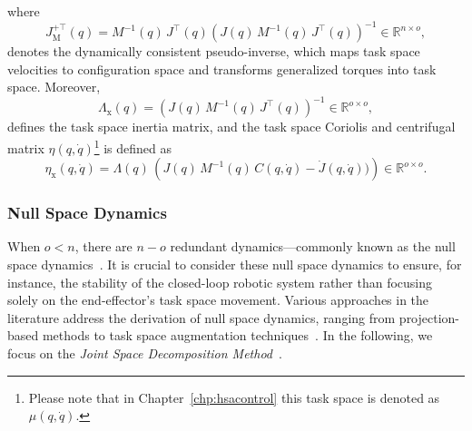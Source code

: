 where 
\begin{equation}
    J_\mathrm{M}^{+\top}(q) = M^{-1}(q) \, J^\top(q) \left ( J(q) \, M^{-1}(q) \, J^\top(q) \right )^{-1} \in \mathbb{R}^{n \times o},
\end{equation}
denotes the dynamically consistent pseudo-inverse\citep{chang1995manipulator}, which maps task space velocities to configuration space and transforms generalized torques into task space. Moreover,
\begin{equation}
    \Lambda_\mathrm{x}(q) = \left ( J(q) \, M^{-1}(q) \, J^\top(q) \right )^{-1} \in \mathbb{R}^{o \times o},
\end{equation}
defines the task space inertia matrix, and the task space Coriolis and centrifugal matrix $\eta(q, \dot{q})$\footnote{Please note that in Chapter~\ref{chp:hsacontrol} this task space is denoted as $\mu(q,\dot{q})$.} is defined as~\citep{khatib1987unified, della2020model}
\begin{equation}
    \eta_\mathrm{x}(q, \dot{q}) = \Lambda(q) \, \left ( J(q) \, M^{-1}(q) \, C(q,\dot{q}) - \dot{J}(q,\dot{q})) \right ) \in \mathbb{R}^{o \times o}.
\end{equation}

\subsubsection{Null Space Dynamics}
When $o < n$, there are $n-o$ redundant dynamics—commonly known as the null space dynamics~\citep{siciliano2010robotics}. It is crucial to consider these null space dynamics to ensure, for instance, the stability of the closed-loop robotic system rather than focusing solely on the end-effector’s task space movement. Various approaches in the literature address the derivation of null space dynamics, ranging from projection-based methods to task space augmentation techniques~\citep{ott2008cartesian}. In the following, we focus on the \emph{Joint Space Decomposition Method}~\citep{ott2008cartesian}.

